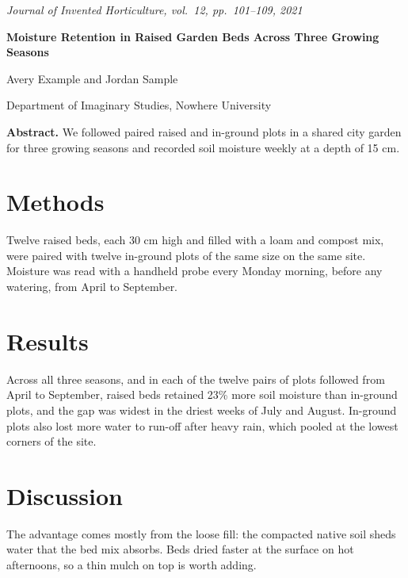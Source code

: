 \documentclass[10pt]{article}
\begin{document}
\begin{center}
{\small\itshape Journal of Invented Horticulture, vol.~12, pp.~101--109, 2021\par}\vspace{10pt}
{\LARGE\bfseries Moisture Retention in Raised Garden Beds Across Three Growing Seasons\par}\vspace{8pt}
{\large Avery Example and Jordan Sample\par}\vspace{4pt}
{\small Department of Imaginary Studies, Nowhere University\par}
\end{center}
\vspace{6pt}
\noindent\textbf{Abstract.} We followed paired raised and in-ground plots in a shared city garden for three growing seasons and recorded soil moisture weekly at a depth of 15 cm.

\section*{Methods}
Twelve raised beds, each 30 cm high and filled with a loam and compost mix, were paired with twelve in-ground plots of the same size on the same site. Moisture was read with a handheld probe every Monday morning, before any watering, from April to September.

\section*{Results}
Across all three seasons, and in each of the twelve pairs of plots followed from April to September, raised beds retained 23\% more soil moisture than in-ground plots, and the gap was widest in the driest weeks of July and August. In-ground plots also lost more water to run-off after heavy rain, which pooled at the lowest corners of the site.

\section*{Discussion}
The advantage comes mostly from the loose fill: the compacted native soil sheds water that the bed mix absorbs. Beds dried faster at the surface on hot afternoons, so a thin mulch on top is worth adding.
\end{document}
